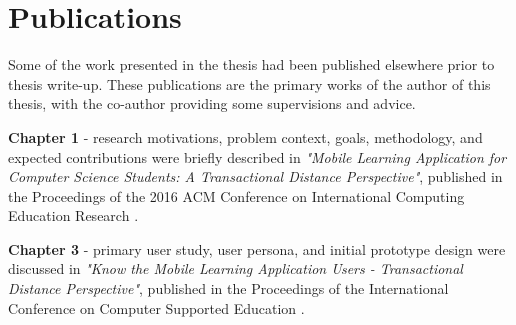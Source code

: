\section{Publications}

Some of the work presented in the thesis had been published elsewhere prior to thesis write-up. These publications are the primary works of the author of this thesis, with the co-author providing some supervisions and advice. 

\textbf{Chapter 1} - research motivations, problem context, goals, methodology, and expected contributions were briefly described in \textit{"Mobile Learning Application for Computer Science Students: A Transactional Distance Perspective"}, published in the Proceedings of the 2016 ACM Conference on International Computing Education Research \cite{limtrairut2016mobile}. 

\textbf{Chapter 3} - primary user study, user persona, and initial prototype design were discussed in \textit{"Know the Mobile Learning Application Users - Transactional Distance Perspective"}, published in the Proceedings of the  International Conference on Computer Supported Education \cite{limtrairut2016know}. 






























